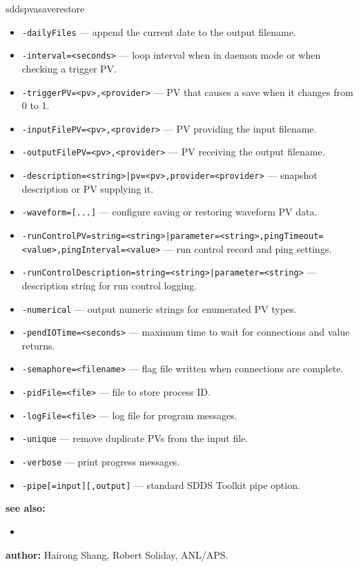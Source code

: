 \begin{sddsprog}{sddspvasaverestore}
\begin{itemize}
  \item {\tt -dailyFiles} --- append the current date to the output filename.
  \item {\tt -interval=<seconds>} --- loop interval when in daemon mode or when checking a trigger PV.
  \item {\tt -triggerPV=<pv>,<provider>} --- PV that causes a save when it changes from 0 to 1.
  \item {\tt -inputFilePV=<pv>,<provider>} --- PV providing the input filename.
  \item {\tt -outputFilePV=<pv>,<provider>} --- PV receiving the output filename.
  \item {\tt -description=<string>|pv=<pv>,provider=<provider>} --- snapshot description or PV supplying it.
  \item {\tt -waveform=[...]} --- configure saving or restoring waveform PV data.
  \item {\tt -runControlPV={string=<string>|parameter=<string>},pingTimeout=<value>,pingInterval=<value>} --- run control record and ping settings.
  \item {\tt -runControlDescription={string=<string>|parameter=<string>}} --- description string for run control logging.
  \item {\tt -numerical} --- output numeric strings for enumerated PV types.
  \item {\tt -pendIOTime=<seconds>} --- maximum time to wait for connections and value returns.
  \item {\tt -semaphore=<filename>} --- flag file written when connections are complete.
  \item {\tt -pidFile=<file>} --- file to store process ID.
  \item {\tt -logFile=<file>} --- log file for program messages.
  \item {\tt -unique} --- remove duplicate PVs from the input file.
  \item {\tt -verbose} --- print progress messages.
  \item {\tt -pipe[=input][,output]} --- standard SDDS Toolkit pipe option.
\end{itemize}
\item \textbf{see also:}
\begin{itemize}
  \item {}
\end{itemize}
\item \textbf{author:} Hairong Shang, Robert Soliday, ANL/APS.
\end{sddsprog}

